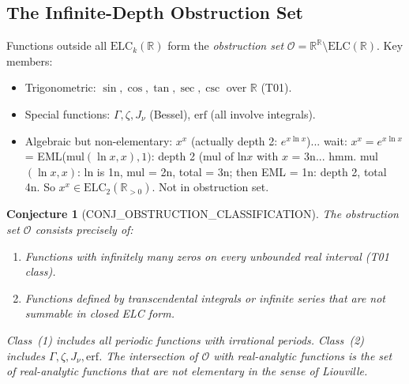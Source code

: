 \documentclass[11pt]{article}
\newtheorem{conjecture}[theorem]{Conjecture}
\begin{document}
\subsection{The Infinite-Depth Obstruction Set}

Functions outside all $\mathrm{ELC}_k(\mathbb{R})$ form the \emph{obstruction set}
$\mathcal{O} = \mathbb{R}^\mathbb{R} \setminus \mathrm{ELC}(\mathbb{R})$.
Key members:
\begin{itemize}
  \item Trigonometric: $\sin, \cos, \tan, \sec, \csc$ over $\mathbb{R}$ (T01).
  \item Special functions: $\Gamma, \zeta, J_\nu$ (Bessel), $\mathrm{erf}$ (all involve integrals).
  \item Algebraic but non-elementary: $x^x$ (actually depth 2: $e^{x\ln x}$)... wait:
        $x^x = e^{x\ln x}$ = EML(mul$(\ln x, x), 1)$: depth 2 (mul of ln$x$ with $x$ = 3n... hmm.
        mul$(\ln x, x)$: ln is 1n, mul = 2n, total = 3n; then EML = 1n: depth 2, total 4n.
        So $x^x \in \mathrm{ELC}_2(\mathbb{R}_{>0})$. Not in obstruction set.
\end{itemize}

\begin{conjecture}[CONJ\_OBSTRUCTION\_CLASSIFICATION]
The obstruction set $\mathcal{O}$ consists precisely of:
\begin{enumerate}
  \item Functions with infinitely many zeros on every unbounded real interval (T01 class).
  \item Functions defined by transcendental integrals or infinite series that are not
        summable in closed ELC form.
\end{enumerate}
Class~(1) includes all periodic functions with irrational periods.
Class~(2) includes $\Gamma, \zeta, J_\nu, \mathrm{erf}$.
The intersection of $\mathcal{O}$ with real-analytic functions is the set of
real-analytic functions that are \emph{not} elementary in the sense of Liouville.
\end{conjecture}
\end{document}
